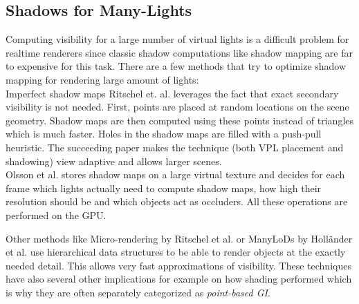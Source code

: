 \documentclass[thesis.tex]{subfiles}
\begin{document}
\subsection{Shadows for Many-Lights}
Computing visibility for a large number of virtual lights is a difficult problem for realtime renderers since classic shadow computations like shadow mapping are far to expensive for this task.
There are a few methods that try to optimize shadow mapping for rendering large amount of lights:
\\
Imperfect shadow maps Ritschel et. al. \cite{bib:imperfectshadowmaps} leverages the fact that exact secondary visibility is not needed.
First, points are placed at random locations on the scene geometry.
Shadow maps are then computed using these points instead of triangles which is much faster.
Holes in the shadow maps are filled with a push-pull heuristic.
The succeeding paper \cite{bib:imperfectshadowmaps:adapative} makes the technique (both VPL placement and shadowing) view adaptive and allows larger scenes.
\\
Olsson et al. \cite{bib:virtualshadowmaps} stores shadow maps on a large virtual texture and decides for each frame which lights actually need to compute shadow maps, how high their resolution should be and which objects act as occluders.
All these operations are performed on the GPU.

Other methods like Micro-rendering by Ritschel et al. \cite{bib:microrendering} or ManyLoDs by Holländer et al. \cite{bib:manylods} use hierarchical data structures to be able to render objects at the exactly needed detail.
This allows very fast approximations of visibility.
These techniques have also several other implications for example on how shading performed which is why they are often separately categorized as \emph{point-based GI}.

%
%
\end{document}
